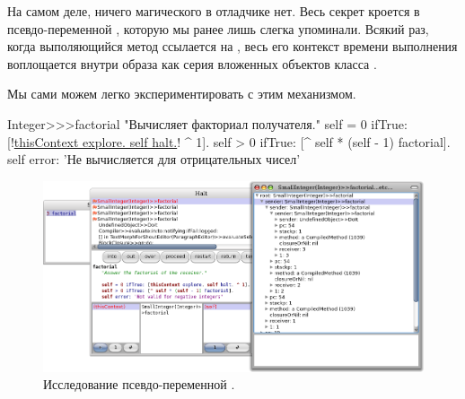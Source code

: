 \documentclass[a4paper,10pt,twoside]{book}
\begin{document}
На самом деле, ничего магического в отладчике нет.
Весь секрет кроется в псевдо-переменной , которую мы ранее лишь слегка упоминали.
Всякий раз, когда выполяющийся метод ссылается на , весь его контекст времени выполнения воплощается внутри образа как серия вложенных объектов класса .

Мы сами можем легко экспериментировать с этим механизмом.


\begin{code}{}
Integer>>>factorial
	"Вычисляет факториал получателя."
	self = 0 ifTrue: [!\underline{thisContext explore. self halt.}! ^ 1].
	self > 0 ifTrue: [^ self * (self - 1) factorial].
	self error: 'Не вычисляется для отрицательных чисел'
\end{code}


\begin{figure}[ht]\centering
	\includegraphics[width=\linewidth]{exploringThisContext}
	\caption{Исследование псевдо-переменной .}
\end{figure}
\end{document}

